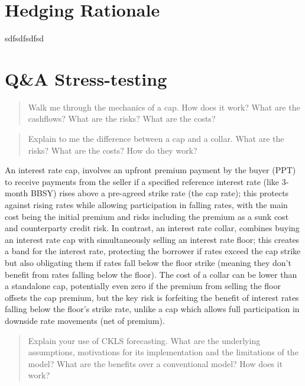 \documentclass[11pt, a4paper, british]{article}
\begin{document}
\newpage

\section{Hedging Rationale }
sdfsdfsdfsd

\newpage

\section{Q\&A Stress-testing}
\begin{quote}
    Walk me through the mechanics of a cap. How does it work? What are the cashflows? What are the risks? What are the costs?
\end{quote}

\newpage

\begin{quote}
    Explain to me the difference between a cap and a collar. What are the risks? What are the costs? How do they work?
\end{quote}

An interest rate cap, involves an upfront premium payment by the buyer (PPT) to receive payments from the seller if a specified reference interest rate (like 3-month BBSY) rises above a pre-agreed strike rate (the cap rate); this protects against rising rates while allowing participation in falling rates, with the main cost being the initial premium and risks including the premium as a sunk cost and counterparty credit risk. In contrast, an interest rate collar, combines buying an interest rate cap with simultaneously selling an interest rate floor; this creates a band for the interest rate, protecting the borrower if rates exceed the cap strike but also obligating them if rates fall below the floor strike (meaning they don't benefit from rates falling below the floor). The cost of a collar can be lower than a standalone cap, potentially even zero if the premium from selling the floor offsets the cap premium, but the key risk is forfeiting the benefit of interest rates falling below the floor's strike rate, unlike a cap which allows full participation in downside rate movements (net of premium). 

\newpage

\begin{quote}
    Explain your use of CKLS forecasting. What are the underlying assumptions, motivations for its implementation and the limitations of the model? What are the benefits over a conventional model? How does it work?
\end{quote}
\end{document}
